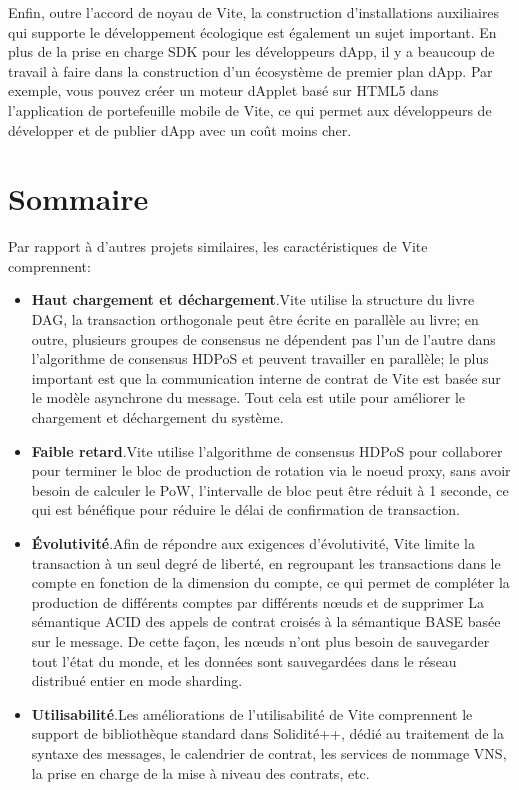 \documentclass[UTF8,nofonts]{article}
\begin{document}
\begin{multicols}{2}
Enfin, outre l'accord de noyau de Vite, la construction d'installations auxiliaires qui supporte le développement écologique est également un sujet important. En plus de la prise en charge SDK pour les développeurs dApp, il y a beaucoup de travail à faire dans la construction d'un écosystème de premier plan dApp. Par exemple, vous pouvez créer un moteur dApplet basé sur HTML5 dans l'application de portefeuille mobile de Vite, ce qui permet aux développeurs de développer et de publier dApp avec un coût moins cher.

\section{Sommaire}
Par rapport à d'autres projets similaires, les caractéristiques de Vite comprennent:

\begin{itemize}
	\item \textbf{Haut chargement et déchargement}.Vite utilise la structure du livre DAG, la transaction orthogonale peut être écrite en parallèle au livre; en outre, plusieurs groupes de consensus ne dépendent pas l'un de l'autre dans l'algorithme de consensus HDPoS et peuvent travailler en parallèle; le plus important est que la communication interne de contrat de Vite est basée sur le modèle asynchrone du message. Tout cela est utile pour améliorer le chargement et déchargement du système.
	\item \textbf{Faible retard}.Vite utilise l'algorithme de consensus HDPoS pour collaborer pour terminer le bloc de production de rotation via le noeud proxy, sans avoir besoin de calculer le PoW, l'intervalle de bloc peut être réduit à 1 seconde, ce qui est bénéfique pour réduire le délai de confirmation de transaction.
	\item \textbf{Évolutivité}.Afin de répondre aux exigences d'évolutivité, Vite limite la transaction à un seul degré de liberté, en regroupant les transactions dans le compte en fonction de la dimension du compte, ce qui permet de compléter la production de différents comptes par différents nœuds et de supprimer La sémantique ACID des appels de contrat croisés à la sémantique BASE basée sur le message. De cette façon, les nœuds n'ont plus besoin de sauvegarder tout l'état du monde, et les données sont sauvegardées dans le réseau distribué entier en mode sharding.
	\item \textbf{Utilisabilité}.Les améliorations de l'utilisabilité de Vite comprennent le support de bibliothèque standard dans Solidité++, dédié au traitement de la syntaxe des messages, le calendrier de contrat, les services de nommage VNS, la prise en charge de la mise à niveau des contrats, etc.

\end{itemize}
\end{multicols}
\end{document}
